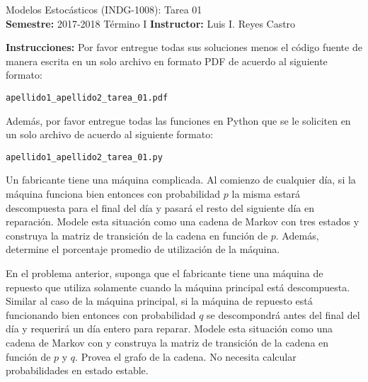 \documentclass[ a4paper, twoside, 11pt]{article}
\newcommand{\numero}{01}
\begin{document}
\allowdisplaybreaks



\begin{center}
\Large Modelos Estoc\'asticos (INDG-1008): Tarea \numero \\[1ex]
\small \textbf{Semestre:} 2017-2018 T\'ermino I \qquad
\textbf{Instructor:} Luis I. Reyes Castro
\end{center}
\fullskip

%

\textbf{Instrucciones:} Por favor entregue todas sus soluciones menos el c\'odigo fuente de manera escrita en un solo archivo en formato PDF de acuerdo al siguiente formato: 
\halfcut
\begin{center}
{\tt apellido1\_apellido2\_tarea\_01.pdf }
\end{center}
Adem\'as, por favor entregue todas las funciones en Python que se le soliciten en un solo archivo de acuerdo al siguiente formato: 
\halfcut
\begin{center}
{\tt apellido1\_apellido2\_tarea\_01.py }
\end{center}
\fullskip
\halfskip

\begin{problem}
Un fabricante tiene una m\'aquina complicada. Al comienzo de cualquier d\'ia, si la m\'aquina funciona bien entonces con probabilidad $p$ la misma estar\'a descompuesta para el final del d\'ia y pasar\'a el resto del siguiente d\'ia en reparaci\'on. Modele esta situaci\'on como una cadena de Markov con tres estados y construya la matriz de transici\'on de la cadena en funci\'on de $p$. Adem\'as, determine el porcentaje promedio de utilizaci\'on de la m\'aquina. 

\end{problem}
\vspace{\baselineskip}

\begin{problem}
En el problema anterior, suponga que el fabricante tiene una m\'aquina de repuesto que utiliza solamente cuando la m\'aquina principal est\'a descompuesta. Similar al caso de la m\'aquina principal, si la m\'aquina de repuesto est\'a funcionando bien entonces con probabilidad $q$ se descompondr\'a antes del final del d\'ia y requerir\'a un d\'ia entero para reparar. Modele esta situaci\'on como una cadena de Markov con y construya la matriz de transici\'on de la cadena en funci\'on de $p$ y $q$. Provea el grafo de la cadena. No necesita calcular probabilidades en estado estable. 

\end{problem}
\vspace{\baselineskip}
\end{document}
